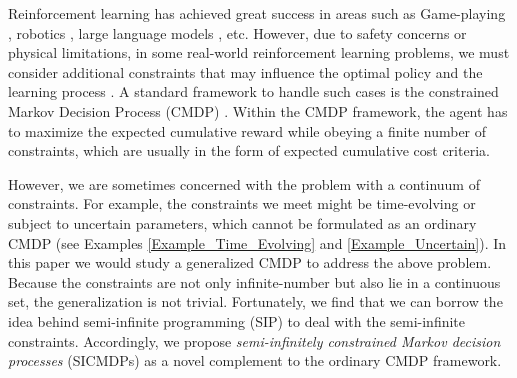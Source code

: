 Reinforcement learning has achieved great success in areas such as Game-playing \citep{silver2018general,vinyals2019grandmaster}, robotics \cite{kober2013reinforcement}, large language models \citep{ouyang2022training}, etc.
However, due to safety concerns or physical limitations, in some real-world reinforcement learning problems, we must consider additional constraints that may influence the optimal policy and the learning process \citep{garcia2015comprehensive}.
A standard framework to handle such cases is the constrained Markov Decision Process (CMDP) \citep{altman1999constrained}.
Within the CMDP framework, the agent has to maximize
the expected cumulative reward while
obeying a finite number of constraints, which are usually in the form of expected cumulative cost criteria.

However, we are sometimes concerned with the problem with a continuum of constraints.
For example,
the constraints we meet might be time-evolving or subject to uncertain parameters, which
cannot be formulated as an ordinary CMDP
(see Examples \ref{Example_Time_Evolving} and  \ref{Example_Uncertain}).
In this paper we would study a generalized CMDP  
to address the above problem.  Because the constraints are not only infinite-number but also lie
in a continuous set,
the generalization is not trivial. Fortunately, we find that we can borrow the idea behind semi-infinite programming (SIP) \citep{remez1934determination, hettich1993semi} to deal with the semi-infinite constraints.
Accordingly, we propose \emph{semi-infinitely constrained Markov decision processes} (SICMDPs)
as a novel complement to the ordinary CMDP framework.


